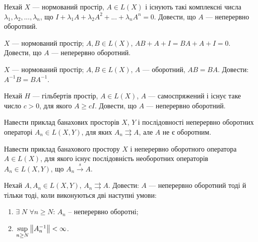 \begin{exercise}
    Нехай $X$ --- нормований простір, $A \in L(X)$ і існують такі комплексні числа
    $\lambda_1, \lambda_2, ..., \lambda_n$, що $I + \lambda_1 A + \lambda_2 A^2
    + ... + \lambda_n A^n = 0$. Довести, що $A$ --- неперервно оборотний.
\end{exercise}

\begin{exercise}
    $X$ --- нормований простір; $A, B \in L(X)$, $AB+A+I=BA+A+I=0$.
    Довести, що $A$ --- неперервно оборотний.
\end{exercise}

\begin{exercise}
    $X$ --- нормований простір; $A, B \in L(X)$, $A$ --- оборотний, $AB=BA$.
    Довести: $A^{-1}B = BA^{-1}$.
\end{exercise}

\begin{exercise}
    Нехай $H$ --- гільбертів простір, $A \in L(X)$, $A$ --- самоспряжений
    і існує таке число $c > 0$, для якого $A \geq cI$.
    Довести, що $A$ --- неперервно оборотний.
\end{exercise}

\begin{exercise}
    Навести приклад банахових просторів $X$, $Y$ і послідовності неперервно
    оборотних операторі $A_n \in L(X,Y)$, для яких $A_n \rightrightarrows A$,
    але $A$ не є оборотним.
\end{exercise}

\begin{exercise}
    Навести приклад банахового простору $X$ і неперервно оборотного оператора
    $A \in L(X)$, для якого існує послідовність необоротних операторів
     $A_n \in L(X,Y)$, що $A_n \overset{s}{\to} A$.
\end{exercise}

\begin{exercise}
    Нехай $A, A_n \in L(X, Y)$, $A_n \rightrightarrows A$.
    Довести: $A$ --- неперервно оборотний тоді й тільки тоді, коли
    виконуються дві наступні умови:
    \begin{enumerate}
        \item $\exists \; N$ $\forall n \geq N$: $A_n$ -- неперервно оборотні;
        \item $\underset{n \geq N}{\sup} \left\lVert A_n^{-1}\right\rVert < \infty$.
    \end{enumerate}
\end{exercise}